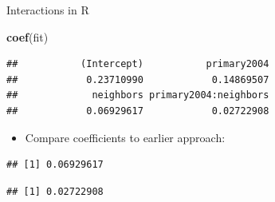 \documentclass[
  ignorenonframetext,
]{beamer}
\newenvironment{Shaded}{\begin{snugshade}}{\end{snugshade}}
\newcommand{\FunctionTok}[1]{\textcolor[rgb]{0.13,0.29,0.53}{\textbf{#1}}}
\newcommand{\NormalTok}[1]{#1}
\newcommand{\SpecialCharTok}[1]{\textcolor[rgb]{0.81,0.36,0.00}{\textbf{#1}}}
\providecommand{\tightlist}{%
  \setlength{\itemsep}{0pt}\setlength{\parskip}{0pt}}
\begin{document}
\begin{frame}[fragile]{Interactions in R}
\label{interactions-in-r-1}
\begin{Shaded}
\begin{Highlighting}[]
\FunctionTok{coef}\NormalTok{(fit)}
\end{Highlighting}
\end{Shaded}

\begin{verbatim}
##           (Intercept)           primary2004 
##            0.23710990            0.14869507 
##             neighbors primary2004:neighbors 
##            0.06929617            0.02722908
\end{verbatim}

\pause

\begin{itemize}
\tightlist
\item
  Compare coefficients to earlier approach:
\end{itemize}

\begin{Shaded}
\end{Shaded}

\begin{verbatim}
## [1] 0.06929617
\end{verbatim}

\pause

\begin{Shaded}
\end{Shaded}

\begin{verbatim}
## [1] 0.02722908
\end{verbatim}
\end{frame}
\end{document}
